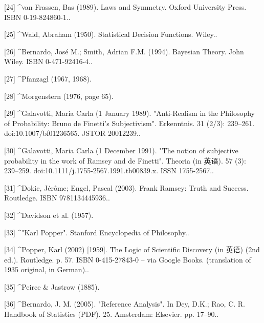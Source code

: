[24]
^van Frassen, Bas (1989). Laws and Symmetry. Oxford University Press. ISBN 0-19-824860-1..

[25]
^Wald, Abraham (1950). Statistical Decision Functions. Wiley..

[26]
^Bernardo, José M.; Smith, Adrian F.M. (1994). Bayesian Theory. John Wiley. ISBN 0-471-92416-4..

[27]
^Pfanzagl (1967, 1968).

[28]
^Morgenstern (1976, page 65).

[29]
^Galavotti, Maria Carla (1 January 1989). "Anti-Realism in the Philosophy of Probability: Bruno de Finetti's Subjectivism". Erkenntnis. 31 (2/3): 239–261. doi:10.1007/bf01236565. JSTOR 20012239..

[30]
^Galavotti, Maria Carla (1 December 1991). "The notion of subjective probability in the work of Ramsey and de Finetti". Theoria (in 英语). 57 (3): 239–259. doi:10.1111/j.1755-2567.1991.tb00839.x. ISSN 1755-2567..

[31]
^Dokic, Jérôme; Engel, Pascal (2003). Frank Ramsey: Truth and Success. Routledge. ISBN 9781134445936..

[32]
^Davidson et al. (1957).

[33]
^"Karl Popper". Stanford Encyclopedia of Philosophy..

[34]
^Popper, Karl (2002) [1959]. The Logic of Scientific Discovery (in 英语) (2nd ed.). Routledge. p. 57. ISBN 0-415-27843-0 – via Google Books. (translation of 1935 original, in German)..

[35]
^Peirce & Jastrow (1885).

[36]
^Bernardo, J. M. (2005). "Reference Analysis". In Dey, D.K.; Rao, C. R. Handbook of Statistics (PDF). 25. Amsterdam: Elsevier. pp. 17–90..